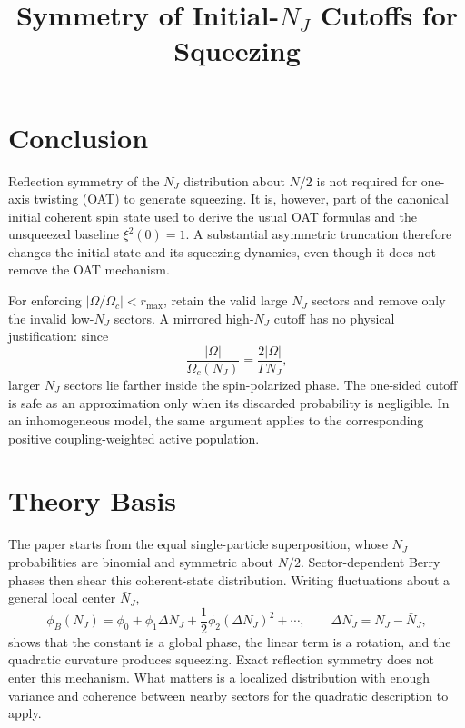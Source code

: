 \documentclass[11pt]{article}
\title{Symmetry of Initial-$N_J$ Cutoffs for Squeezing}
\author{}
\date{}
\begin{document}
\maketitle

\section{Conclusion}

Reflection symmetry of the $N_J$ distribution about $N/2$ is not required for
one-axis twisting (OAT) to generate squeezing.  It is, however, part of the
canonical initial coherent spin state used to derive the usual OAT formulas
and the unsqueezed baseline $\xi^2(0)=1$.  A substantial asymmetric truncation
therefore changes the initial state and its squeezing dynamics, even though it
does not remove the OAT mechanism.

For enforcing $\lvert\Omega/\Omega_c\rvert<r_{\max}$, retain the valid large
$N_J$ sectors and remove only the invalid low-$N_J$ sectors.  A mirrored
high-$N_J$ cutoff has no physical justification: since
\begin{equation}
  \frac{\lvert\Omega\rvert}{\Omega_c(N_J)}
  = \frac{2\lvert\Omega\rvert}{\Gamma N_J},
\end{equation}
larger $N_J$ sectors lie farther inside the spin-polarized phase.  The
one-sided cutoff is safe as an approximation only when its discarded
probability is negligible.  In an inhomogeneous model, the same argument
applies to the corresponding positive coupling-weighted active population.

\section{Theory Basis}

The paper starts from the equal single-particle superposition, whose $N_J$
probabilities are binomial and symmetric about $N/2$.  Sector-dependent Berry
phases then shear this coherent-state distribution.  Writing fluctuations
about a general local center $\bar N_J$,
\begin{equation}
  \phi_B(N_J)
  = \phi_0 + \phi_1\Delta N_J
    + \frac{1}{2}\phi_2(\Delta N_J)^2 + \cdots,
  \qquad \Delta N_J=N_J-\bar N_J,
\end{equation}
shows that the constant is a global phase, the linear term is a rotation, and
the quadratic curvature produces squeezing.  Exact reflection symmetry does
not enter this mechanism.  What matters is a localized distribution with
enough variance and coherence between nearby sectors for the quadratic
description to apply.
\end{document}
